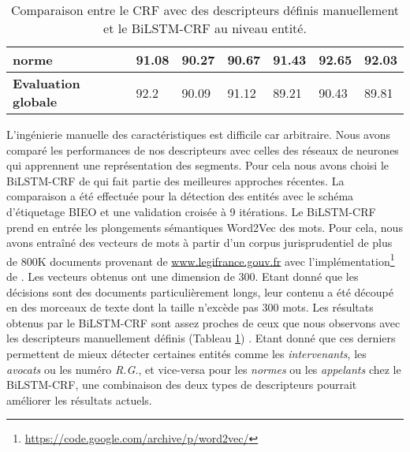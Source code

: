 \begin{table}[!h]
\begin{tabular}{|l|l|l|l|l|l|l|}
		\textbf{norme}         & 91.08              & 90.27                               & 90.67       & 91.43              & 92.65                & 92.03       \\ \hline
		\noalign{\smallskip}\hline\noalign{\smallskip}
		\textbf{Evaluation globale} & 92.2               & 90.09                               & 91.12       & 89.21              & 90.43                & 89.81       \\ \hline
	\end{tabular}
	\caption{Comparaison entre le CRF avec des descripteurs définis manuellement et le BiLSTM-CRF au niveau entité.}\label{tab:structuration:perf-bilstmcrf}
\end{table}

L'ingénierie manuelle des caractéristiques est difficile car arbitraire. Nous avons comparé les performances de nos descripteurs avec celles des réseaux de neurones qui apprennent une représentation des segments. Pour cela nous avons choisi le BiLSTM-CRF de \citet{lample2016nnner} qui fait partie des meilleures approches récentes. La comparaison a été effectuée pour la détection des entités avec le schéma d'étiquetage BIEO et une validation croisée à 9 itérations. Le BiLSTM-CRF prend en entrée les plongements sémantiques Word2Vec des mots. Pour cela, nous avons entraîné des vecteurs de mots à partir d'un corpus jurisprudentiel de plus de 800K documents provenant de \url{www.legifrance.gouv.fr} avec l'implémentation\footnote{\url{https://code.google.com/archive/p/word2vec/}} de \citet{lemikolov2014word2vec}. Les vecteurs obtenus ont une dimension de 300. Etant donné que les décisions sont des documents particulièrement longs, leur contenu a été découpé en des morceaux de texte dont la taille n'excède pas 300 mots. Les résultats obtenus par le BiLSTM-CRF sont assez proches de ceux que nous observons avec les descripteurs manuellement définis (Tableau \ref{tab:structuration:perf-bilstmcrf}) . Etant donné que ces derniers permettent de mieux détecter certaines entités comme les \textit{intervenants}, les \textit{avocats} ou les numéro \textit{R.G.}, et vice-versa pour les \textit{normes} ou les \textit{appelants} chez le BiLSTM-CRF, une combinaison des deux types de descripteurs pourrait améliorer les résultats actuels. %
 


